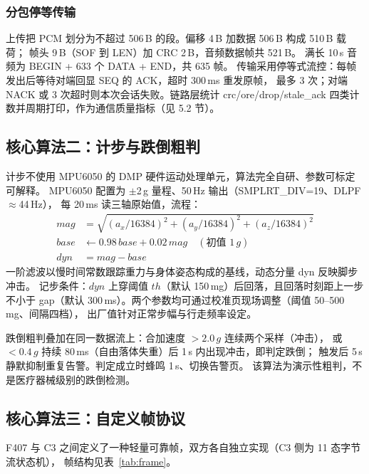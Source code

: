 \subsubsection{分包停等传输}
上传把 PCM 划分为不超过 506\,B 的段。偏移 4\,B 加数据 506\,B 构成 510\,B 载荷；
帧头 9\,B（SOF 到 LEN）加 CRC 2\,B，音频数据帧共 521\,B。
满长 10\,s 音频为 BEGIN + 633 个 DATA + END，共 635 帧。
传输采用停等式流控：每帧发出后等待对端回显 SEQ 的 ACK，超时 300\,ms 重发原帧，
最多 3 次；对端 NACK 或 3 次超时则本次会话失败。链路层统计 crc/ore/drop/stale\_ack
四类计数并周期打印，作为通信质量指标（见 5.2 节）。

\subsection{核心算法二：计步与跌倒粗判}
计步不使用 MPU6050 的 DMP 硬件运动处理单元，算法完全自研、参数可标定可解释。
MPU6050 配置为 $\pm$2\,g 量程、50\,Hz 输出（SMPLRT\_DIV=19、DLPF$\approx$44\,Hz），
每 20\,ms 读三轴原始值，流程：
\begin{align}
mag &= \sqrt{(a_x/16384)^2+(a_y/16384)^2+(a_z/16384)^2}\\
base &\leftarrow 0.98\,base + 0.02\,mag \quad (\text{初值 }1\,g)\\
dyn &= mag - base
\end{align}
一阶滤波以慢时间常数跟踪重力与身体姿态构成的基线，动态分量 dyn 反映脚步冲击。
记步条件：$dyn$ 上穿阈值 $th$（默认 150\,mg）后回落，且回落时刻距上一步不小于
gap（默认 300\,ms）。两个参数均可通过校准页现场调整（阈值 50--500\,mg、间隔四档），
出厂值针对正常步幅与行走频率设定。

跌倒粗判叠加在同一数据流上：合加速度 $>2.0\,g$ 连续两个采样（冲击），
或 $<0.4\,g$ 持续 80\,ms（自由落体失重）后 1\,s 内出现冲击，即判定跌倒；
触发后 5\,s 静默抑制重复告警。判定成立时蜂鸣 1\,s、切换告警页。
该算法为演示性粗判，不是医疗器械级别的跌倒检测。

\subsection{核心算法三：自定义帧协议}
F407 与 C3 之间定义了一种轻量可靠帧，双方各自独立实现（C3 侧为 11 态字节流状态机），
帧结构见表~\ref{tab:frame}。

